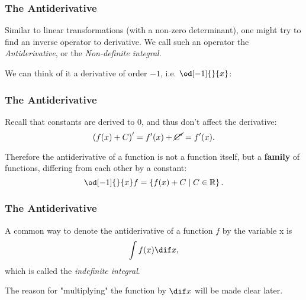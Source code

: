 \begin{frame}
	\frametitle{The Antiderivative}
	Similar to linear transformations (with a non-zero determinant), one might try to find an inverse operator to derivative. We call such an operator the \emph{Antiderivative}, or the \emph{Non-definite integral}.

	We can think of it a derivative of order $-1$, i.e. $\od[-1]{}{x}$:

	\vspace{5mm}
	\centering
\end{frame}

\begin{frame}
	\frametitle{The Antiderivative}
	Recall that constants are derived to $0$, and thus don't affect the derivative:
	\begin{equation*}
		\left( f(x) + C \right)' = f'(x) + \cancel{C'} = f'(x).
	\end{equation*}

	Therefore the antiderivative of a function is not a function itself, but a \textbf{family} of functions, differing from each other by a constant:
	\begin{equation*}
		\od[-1]{}{x}f = \left\{ f(x)+C \mid C\in\mathbb{R} \right\}.
	\end{equation*}
\end{frame}

\begin{frame}
	\frametitle{The Antiderivative}
	A common way to denote the antiderivative of a function $f$ by the variable x is
	\begin{equation*}
		\int f(x) \dif x,
	\end{equation*}
	which is called the \emph{indefinite integral}.

	The reason for "multiplying" the function by $\dif x$ will be made clear later.
\end{frame}


